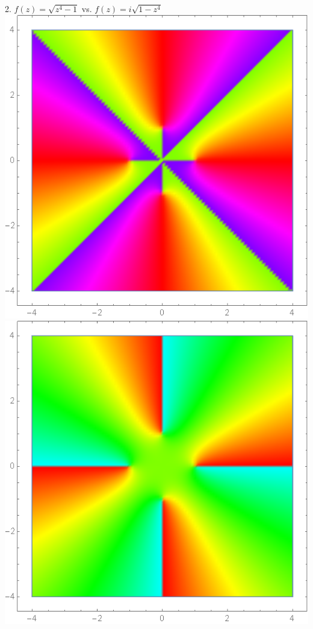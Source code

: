 \documentclass[12pt]{scrartcl}
\begin{document}
\begin{center}
	2. $f(z) = \sqrt{z^4-1}$ vs. $f(z) = i\sqrt{1-z^4}$ \\
	\includegraphics[scale=0.27]{images/poszfourminus1.png}
	\includegraphics[scale=0.27]{images/negzfourminus1.png}
\end{center}
\end{document}
